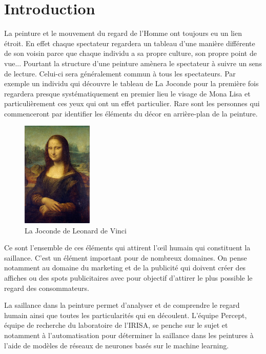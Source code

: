 \chapter{Introduction}


\par
La peinture et le mouvement du regard de l'Homme ont toujours eu un lien étroit. En effet chaque spectateur regardera un tableau d'une manière différente de son voisin parce que chaque individu a sa propre culture, son propre point de vue... Pourtant la structure d'une peinture amènera le spectateur à suivre un sens de lecture. Celui-ci sera généralement commun à tous les spectateurs. Par exemple un individu qui découvre le tableau de La Joconde pour la première fois regardera presque systématiquement en premier lieu le visage de Mona Lisa et particulièrement ces yeux qui ont un effet particulier. Rare sont les personnes qui commenceront par identifier les éléments du décor en arrière-plan de la peinture.

\begin{figure}[h]
    \centering
    \includegraphics[width=0.3\textwidth]
                    {datas/Mona_Lisa_by_Leonardo_da_Vinci.jpg}
    \caption{La Joconde de Leonard de Vinci}
\end{figure}

\par
Ce sont l'ensemble de ces éléments qui attirent l'\oe{}il humain qui constituent la saillance. C'est un élément important pour de nombreux domaines. On pense notamment au domaine du marketing et de la publicité qui doivent créer des affiches ou des spots publicitaires avec pour objectif d'attirer le plus possible le regard des consommateurs.

\par
La saillance dans la peinture permet d'analyser et de comprendre le regard humain ainsi que toutes les particularités qui en découlent. L'équipe Percept, équipe de recherche du laboratoire de l'IRISA, se penche sur le sujet et notamment à l'automatisation pour déterminer la saillance dans les peintures à l'aide de modèles de réseaux de neurones basés sur le machine learning.

